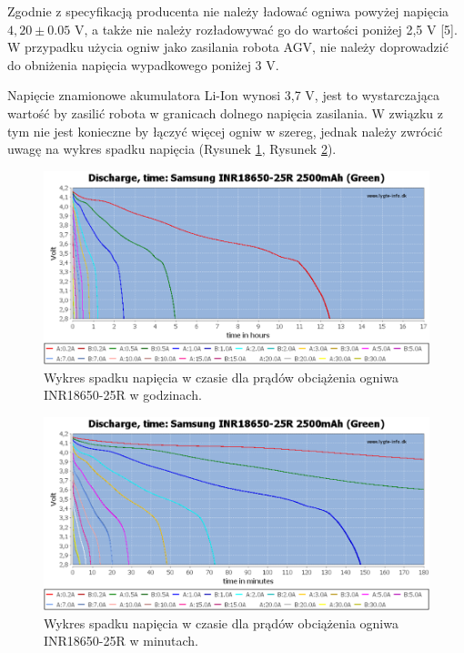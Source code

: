 \documentclass{report}
\begin{document}
\begin{enumerate}[label=(\Alph*)]
    Zgodnie z specyfikacją producenta nie należy ładować ogniwa powyżej napięcia $4,20 \pm 0.05$ V, a także nie należy rozładowywać go do wartości poniżej 2,5 V [5]. W przypadku użycia ogniw jako zasilania robota AGV, nie należy doprowadzić do obniżenia napięcia wypadkowego poniżej 3 V.
    
    Napięcie znamionowe akumulatora Li-Ion wynosi 3,7 V, jest to wystarczająca wartość by zasilić robota w granicach dolnego napięcia zasilania. W związku z tym nie jest konieczne by łączyć więcej ogniw w szereg, jednak należy zwrócić uwagę na wykres spadku napięcia (Rysunek \ref{fig:18650-h}, Rysunek \ref{fig:18650-m}).

    \begin{figure}[H]
        \centering
        \includegraphics{src/cells_charts/Li-ion discharge hours.png}
        \caption{Wykres spadku napięcia w czasie dla prądów obciążenia ogniwa INR18650-25R w godzinach.}
        \label{fig:18650-h}
    \end{figure}

    \begin{figure}[H]
        \centering
        \includegraphics{src/cells_charts/Li-ion discharge minutes.png}
        \caption{Wykres spadku napięcia w czasie dla prądów obciążenia ogniwa INR18650-25R w minutach.}
        \label{fig:18650-m}
    \end{figure}


\end{enumerate}
\end{document}
